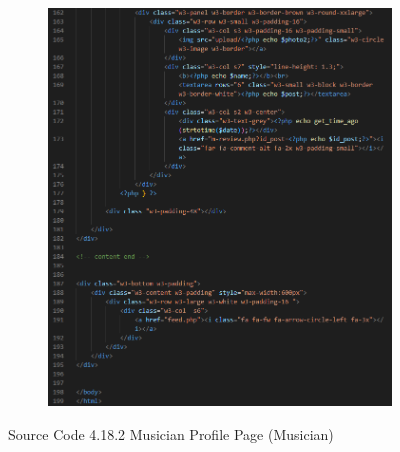 \begin{enumerate}[1.]
\begin{figure}[h]
\begin{subfigure}[b]{0.7\textwidth}
            \includegraphics[width=\textwidth]{mainmatter/images/frontend/code/mprofile3.png}
            \label{fig:sub3}
        \end{subfigure}
        \caption*{Source Code 4.18.2 Musician Profile Page (Musician)}
        \label{fig:myfig57b}
    \end{figure}


\end{enumerate}
